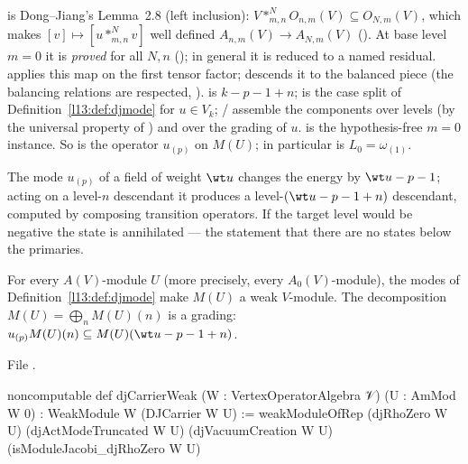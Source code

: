 \begin{dictionary}
 is Dong--Jiang's Lemma~2.8 (left inclusion): $V*^N_{m,n}O_{n,m}(V)\subseteq O_{N,m}(V)$, which makes
$[v]\mapsto[u*^N_{m,n}v]$ well defined $A_{n,m}(V)\to A_{N,m}(V)$ (). At base level $m = 0$ it is
\emph{proved} for all $N,n$ (); in general it is reduced to a named residual. 
applies this map on the first tensor factor;  descends it to the balanced piece (the balancing relations are
respected, ).  is $k-p-1+n$;  is the case split of
Definition~\ref{l13:def:djmode} for $u\in V_k$; / assemble the components over levels (by the
universal property of ) and over the grading of $u$.  is the hypothesis-free $m = 0$ instance. So
 is the operator $u_{(p)}$ on $M(U)$; in particular  is
$L_0 = \omega_{(1)}$.
\end{dictionary}

\begin{physics}
The mode $u_{(p)}$ of a field of weight $\wt u$ changes the energy by $\wt u-p-1$; acting on a level-$n$ descendant it produces a
level-$(\wt u-p-1+n)$ descendant, computed by composing transition operators. If the target level would be negative the state is
annihilated --- the statement that there are no states below the primaries.
\end{physics}

\begin{theorem}\label{l13:thm:djweak}
For every $A(V)$-module $U$ (more precisely, every $A_0(V)$-module), the modes of Definition~\ref{l13:def:djmode} make $M(U)$
a weak $V$-module. The decomposition $M(U) = \bigoplus_nM(U)(n)$ is a grading: $u_{(p)}M(U)(n)\subseteq M(U)(\wt u-p-1+n)$.
\end{theorem}
\noindent File .
\begin{leancode}
noncomputable def djCarrierWeak (W : VertexOperatorAlgebra 𝒱) (U : AmMod W 0) :
    WeakModule W (DJCarrier W U) :=
  weakModuleOfRep (djRhoZero W U) (djActModeTruncated W U) (djVacuumCreation W U)
    (isModuleJacobi_djRhoZero W U)
\end{leancode}

